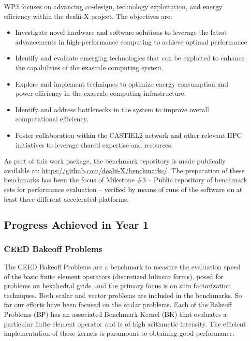 \documentclass[a4paper,12pt, numbers]{article}
\begin{document}
WP3 focuses on advancing co-design, technology exploitation, and energy efficiency within the dealii-X project. The objectives are:

\begin{itemize}[left=1em, itemsep=0pt, topsep=0pt]
\item Investigate novel hardware and software solutions to leverage the latest advancements in high-performance computing to achieve optimal performance
\item Identify and evaluate emerging technologies that can be exploited to enhance the capabilities of the exascale computing system.
\item Explore and implement techniques to optimize energy consumption and power efficiency in the exascale computing infrastructure.
\item Identify and address bottlenecks in the system to improve overall computational efficiency.
\item Foster collaboration within the CASTIEL2 network and other relevant HPC initiatives to leverage shared expertise and resources.
\end{itemize}

As part of this work package, the benchmark repository is made publically available at: \url{https://github.com/dealii-X/benchmarks/}. The preparation of these benchmarks has been the focus of Milestone \#3 -- Public repository of benchmark sets for performance evaluation -- verified by means of runs of the software on at least three different accelerated platforms.


\subsection{Progress Achieved in Year 1} %

\subsubsection*{CEED Bakeoff Problems}

The CEED Bakeoff Problems are a benchmark to measure the evaluation speed of the basic finite element operators (discretized bilinear forms), posed for problems on hexahedral grids, and the primary focus is on sum factorization techniques.  Both scalar and vector problems are included in the benchmarks. So far our efforts have been focused on the scalar problems. Each of the Bakeoff Problems (BP) has an associated Benchmark Kernel (BK) that evaluates a particular finite element operator and is of high arithmetic intensity.  The efficient implementation of these kernels is paramount to obtaining good performance.
\end{document}
